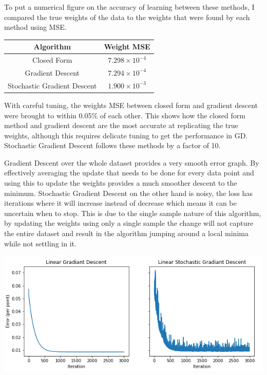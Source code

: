\documentclass[sigconf]{acmart}
\begin{document}
To put a numerical figure on the accuracy of learning between these methods, I compared the true weights of the data to the weights that were found by each method using MSE. 
\begin{center}
    \begin{tabular}{| c c |}
        \hline
        Algorithm & Weight MSE \\ 
        \hline\hline
        Closed Form & $7.298 \times 10^{-4}$\\ 
        Gradient Descent & $7.294 \times 10^{-4}$ \\
        Stochastic Gradient Descent & $1.900 \times 10^{-3}$\\
        \hline      
    \end{tabular}
\end{center}
With careful tuning, the weights MSE between closed form and gradient descent were brought to within 0.05\% of each other. 
This shows how the closed form method and gradient descent are the most accurate at replicating the true weights, although this requires delicate tuning to get the performance in GD. Stochastic Gradient Descent follows these methods by a factor of 10.

Gradient Descent over the whole dataset provides a very smooth error graph. By effectively averaging the update that needs to be done for every data point and using this to update the weights provides a much smoother descent to the minimum.
Stochastic Gradient Descent on the other hand is noisy, the loss has iterations where it will increase instead of decrease which means it can be uncertain when to stop. This is due to the single sample nature of this algorithm, by updating the weights using only a single sample the change will not capture the entire dataset and result in the algorithm jumping around a local minima while not settling in it.

\begin{center}
    \includegraphics[width=\linewidth]{figs/GD vs SGD.png}
\end{center}
\end{document}
